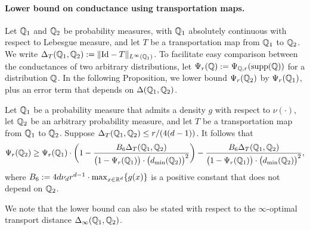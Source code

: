 \paragraph{Lower bound on conductance using transportation maps.}
Let $\mathbb{Q}_1$ and $\mathbb{Q}_2$ be probability measures, with $\mathbb{Q}_1$ absolutely continuous with respect to Lebesgue measure, and let $T$ be a transportation map from $\mathbb{Q}_1$ to $\mathbb{Q}_2$. We write $\Delta_T(\mathbb{Q}_1,\mathbb{Q}_2) := \|\mathrm{Id} - T\|_{L^{\infty}(\mathbb{Q}_1)}$. To facilitate easy comparison between the conductances of two arbitrary distributions, let $\Psi_r(\mathbb{Q}) := \Psi_{\mathbb{Q},r}(\mathrm{supp}(\mathbb{Q}))$ for a distribution $\mathbb{Q}$. In the following Proposition, we lower bound $\Psi_r(\mathbb{Q}_2)$ by $\Psi_r(\mathbb{Q}_1)$, plus an error term that depends on $\Delta(\mathbb{Q}_1,\mathbb{Q}_2)$.
\begin{proposition}
	\label{prop:conductance_lb_transportation_distance}
	Let $\mathbb{Q}_1$ be a probability measure that admits a density $g$ with respect to $\nu(\cdot)$, let $\mathbb{Q}_2$ be an arbitrary probability measure, and let $T$ be a transportation map from $\mathbb{Q}_1$ to $\mathbb{Q}_2$. Suppose $\Delta_T(\mathbb{Q}_1,\mathbb{Q}_2) \leq r/(4(d - 1))$. It follows that
	\begin{equation}
	\label{eqn:conductance_lb_transportation_distance}
	\Psi_r(\mathbb{Q}_2) \geq \Psi_r(\mathbb{Q}_1) \cdot \biggl(1 - \frac{B_6\Delta_T(\mathbb{Q}_1,\mathbb{Q}_2)}{\bigl(1 - \Psi_r(\mathbb{Q}_1)\bigr) \cdot \bigl(d_{\min}(\mathbb{Q}_2)\bigr)^2}\biggr) - \frac{B_6 \Delta_T(\mathbb{Q}_1,\mathbb{Q}_2)}{\bigl(1 - \Psi_r(\mathbb{Q}_1)\bigr) \cdot \bigl(d_{\min}(\mathbb{Q}_2)\bigr)^2},
	\end{equation}
	where $B_6 := 4d \nu_d r^{d - 1} \cdot \max_{x \in \mathbb{R}^d}\{g(x)\}$ is a positive constant that does not depend on $\mathbb{Q}_2$. 
\end{proposition}
We note that the lower bound can also be stated with respect to the $\infty$-optimal transport distance $\Delta_{\infty}(\mathbb{Q}_1,\mathbb{Q}_2)$. 
